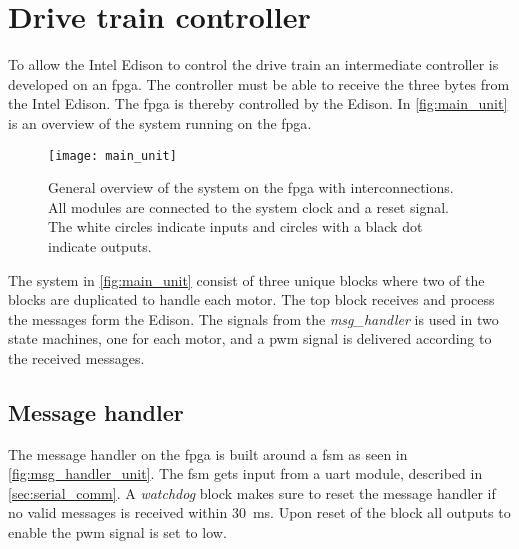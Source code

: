 \section{Drive train controller}

%
%
%
%
%
%

To allow the Intel Edison to control the drive train an intermediate controller is developed on an \gls{fpga}. The controller must be able to receive the three bytes from the Intel Edison. The \gls{fpga} is thereby controlled by the Edison. In \autoref{fig:main_unit} is an overview of the system running on the \gls{fpga}. 


\begin{figure}[h]
    \centering
    \texttt{[image: main\_unit]}
    \caption{General overview of the system on the \gls{fpga} with interconnections. All modules are connected to the system clock and a reset signal. The white circles indicate inputs and circles with a black dot indicate outputs.}
    \label{fig:main_unit}
\end{figure}
    
The system in \autoref{fig:main_unit} consist of three unique blocks where two of the blocks are duplicated to handle each motor. The top block receives and process the messages form the Edison. The signals from the \textit{msg_handler} is used in two state machines, one for each motor, and a \gls{pwm} signal is delivered according to the received messages. 

\subsection{Message handler}
The message handler on the \gls{fpga} is built around a \gls{fsm} as seen in \autoref{fig:msg_handler_unit}. The \gls{fsm} gets input from a \gls{uart} module, described in \autoref{sec:serial_comm}. A \textit{watchdog} block makes sure to reset the message handler if no valid messages is received within \SI{30}{\milli\second}. Upon reset of the block all outputs to enable the \gls{pwm} signal is set to low.

